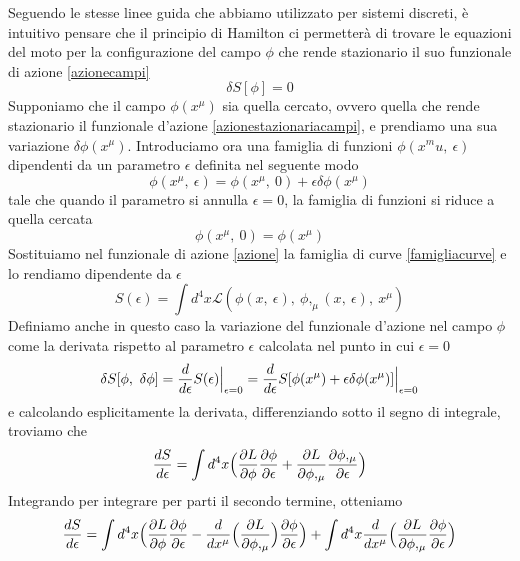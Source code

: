     Seguendo le stesse linee guida che abbiamo utilizzato per sistemi discreti, è intuitivo pensare che il principio di Hamilton ci permetterà di trovare le equazioni del moto per la configurazione del campo $\phi$ che rende stazionario il suo funzionale di azione \eqref{azionecampi}
\begin{equation} \label{azionestazionariacampi}
    \delta S [\phi] = 0
\end{equation}
    Supponiamo che il campo $\phi(x^\mu)$ sia quella cercato, ovvero quella che rende stazionario il funzionale d'azione \eqref{azionestazionariacampi}, e prendiamo una sua variazione $\delta \phi(x^\mu)$. Introduciamo ora una famiglia di funzioni $\phi(x^mu, ~\epsilon)$ dipendenti da un parametro $\epsilon$ definita nel seguente modo 
\begin{equation} \label{famigliacurvecampi}
    \phi(x^\mu, ~\epsilon) = \phi(x^\mu, ~0) + \epsilon \delta \phi(x^\mu)
\end{equation}
    tale che quando il parametro si annulla $\epsilon=0$, la famiglia di funzioni si riduce a quella cercata
\begin{equation*}
    \phi(x^\mu, ~ 0) = \phi(x^\mu)
\end{equation*}
    Sostituiamo nel funzionale di azione \eqref{azione} la famiglia di curve \eqref{famigliacurve} e lo rendiamo dipendente da $\epsilon$
\begin{equation*}
    S(\epsilon) = \int d^4 x \mathcal L (\phi(x,~\epsilon),~\phi,_\mu(x, ~\epsilon),~x^\mu)
\end{equation*}
    Definiamo anche in questo caso la variazione del funzionale d'azione nel campo $\phi$ come la derivata rispetto al parametro $\epsilon$ calcolata nel punto in cui $\epsilon = 0$
\begin{equation} \label{variazioneazionecampi}
    \delta S[\phi, ~ \delta \phi] = \frac{d}{d\epsilon} S(\epsilon) \Big \vert_{\epsilon = 0} = \frac{d}{d\epsilon} S[\phi(x^\mu) + \epsilon \delta \phi(x^\mu)] \Big \vert_{\epsilon = 0}
\end{equation}
    e calcolando esplicitamente la derivata, differenziando sotto il segno di integrale, troviamo che 
\begin{equation*}
    \frac{dS}{d\epsilon} = \int d^4 x \Big (\frac{\partial L}{\partial\phi} \frac{\partial\phi}{\partial\epsilon} + \frac{\partial L}{\partial\phi,_\mu} \frac{\partial\phi,_\mu}{\partial\epsilon} \Big)
\end{equation*}\label{prova1campi}
    Integrando per integrare per parti il secondo termine, otteniamo
\begin{equation}
    \frac{dS}{d\epsilon} = \int d^4 x \Big (\frac{\partial L}{\partial\phi} \frac{\partial\phi}{\partial\epsilon} - \frac{d}{dx^\mu} \Big (\frac{\partial L}{\partial\phi,_\mu} \Big) \frac{\partial\phi}{\partial\epsilon} \Big) + \int d^4 x \frac{d}{dx^\mu} \Big ( \frac{\partial L}{\partial\phi,_\mu} \frac{\partial\phi}{\partial\epsilon} \Big )
\end{equation}
